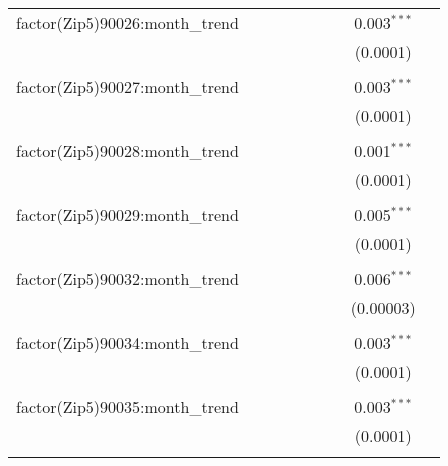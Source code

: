 \begin{table}[H]
{\begin{tabular}{@{\extracolsep{5pt}}lcccccccc}
  factor(Zip5)90026:month\_trend &  &  &  &  &  &  & 0.003$^{***}$ &  \\  

   &  &  &  &  &  &  & (0.0001) &  \\  

   & & & & & & & & \\  

  factor(Zip5)90027:month\_trend &  &  &  &  &  &  & 0.003$^{***}$ &  \\  

   &  &  &  &  &  &  & (0.0001) &  \\  

   & & & & & & & & \\  

  factor(Zip5)90028:month\_trend &  &  &  &  &  &  & 0.001$^{***}$ &  \\  

   &  &  &  &  &  &  & (0.0001) &  \\  

   & & & & & & & & \\  

  factor(Zip5)90029:month\_trend &  &  &  &  &  &  & 0.005$^{***}$ &  \\  

   &  &  &  &  &  &  & (0.0001) &  \\  

   & & & & & & & & \\  

  factor(Zip5)90032:month\_trend &  &  &  &  &  &  & 0.006$^{***}$ &  \\  

   &  &  &  &  &  &  & (0.00003) &  \\  

   & & & & & & & & \\  

  factor(Zip5)90034:month\_trend &  &  &  &  &  &  & 0.003$^{***}$ &  \\  

   &  &  &  &  &  &  & (0.0001) &  \\  

   & & & & & & & & \\  

  factor(Zip5)90035:month\_trend &  &  &  &  &  &  & 0.003$^{***}$ &  \\  

   &  &  &  &  &  &  & (0.0001) &  \\  

   & & & & & & & & \\  


\end{tabular}}
\end{table}
